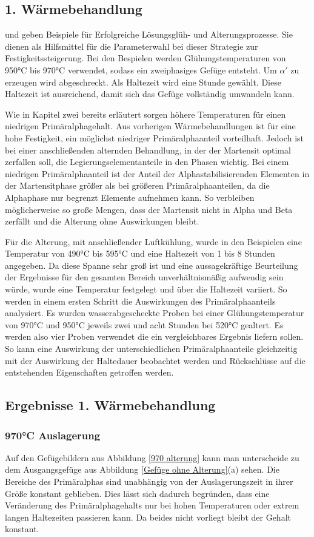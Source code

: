 \documentclass[a4paper, 11pt]{tubsreprt}
\begin{document}
\subsection{1. Wärmebehandlung}
\cite{Gilbert2004} und \cite{chen2008} geben Beispiele für Erfolgreiche Lösungsglüh- und Alterungsprozesse. Sie dienen als Hilfsmittel für die Parameterwahl bei dieser Strategie zur Festigkeitssteigerung. Bei den Bespielen werden Glühungstemperaturen von 950°C bis 970°C verwendet, sodass ein zweiphasiges Gefüge entsteht. Um $\alpha'$ zu erzeugen wird abgeschreckt. Als Haltezeit wird eine Stunde gewählt. Diese Haltezeit ist ausreichend, damit sich das Gefüge vollständig umwandeln kann.

Wie in Kapitel zwei bereits erläutert sorgen höhere Temperaturen für einen niedrigen Primäralphagehalt. Aus vorherigen Wärmebehandlungen ist für eine hohe Festigkeit, ein möglichst niedriger Primäralphaanteil vorteilhaft. Jedoch ist bei einer anschließenden alternden Behandlung, in der der Martensit optimal zerfallen soll, die Legierungselementanteile in den Phasen wichtig. Bei einem niedrigen Primäralphaanteil ist der Anteil der Alphastabilisierenden Elementen in der Martensitphase größer als bei größeren Primäralphaanteilen, da die Alphaphase nur begrenzt Elemente aufnehmen kann. So verbleiben möglicherweise so große Mengen, dass der Martensit nicht in Alpha und Beta zerfällt und die Alterung ohne Auswirkungen bleibt.

Für die Alterung, mit anschließender Luftkühlung, wurde in den Beispielen eine Temperatur von 490°C bis 595°C und eine Haltezeit von 1 bis 8 Stunden angegeben. Da diese Spanne sehr groß ist und eine aussagekräftige Beurteilung der Ergebnisse für den gesamten Bereich unverhältnismäßig aufwendig sein würde, wurde eine Temperatur festgelegt und über die Haltezeit variiert. So werden in einem ersten Schritt die Auswirkungen des Primäralphaanteils analysiert. Es wurden wasserabgescheckte Proben bei einer Glühungstemperatur von 970°C und 950°C jeweils zwei und acht Stunden bei 520°C gealtert. Es werden also vier Proben verwendet die ein vergleichbares Ergebnis liefern sollen. So kann eine Auswirkung der unterschiedlichen Primäralphaanteile gleichzeitig mit der Auswirkung der Haltedauer beobachtet werden und Rückschlüsse auf die entstehenden Eigenschaften getroffen werden.
\subsection{Ergebnisse 1. Wärmebehandlung}
\subsubsection{970°C Auslagerung}
Auf den Gefügebildern aus Abbildung \ref{970 alterung} kann man unterscheide zu dem Ausgangsgefüge aus Abbildung \ref{Gefüge ohne Alterung}(a) sehen. Die Bereiche des Primäralphas sind unabhängig von der Auslagerungszeit in ihrer Größe konstant geblieben. Dies lässt sich dadurch begründen, dass eine Veränderung des Primäralphagehalts nur bei hohen Temperaturen oder extrem langen Haltezeiten passieren kann. Da beides nicht vorliegt bleibt der Gehalt konstant.
\end{document}
